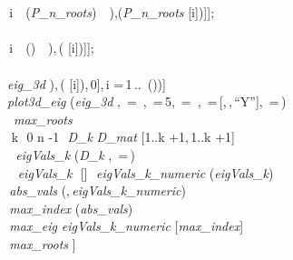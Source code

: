 \documentclass{article}
\begin{document}
{  \coloneqq []\colon 
\\
  \coloneqq []\colon 
\\
 \,i \,\, (\textit{P\_n\_roots})\, \, \coloneqq [\mathit{op} (\mathit{points}),\,[\Re (\textit{P\_n\_roots} [i]),\Im (\textit{P\_n\_roots} [i])]];
\\
 \,\colon 
\\
 \,i \,\, ()\, \, \coloneqq [\mathit{op} (\mathit{eig}),\,[\Re (\mathit{eigVals} [i]),\,\Im ( [i])]];
\\
 \,\colon 
\\
   \textit{eig\_3d} \coloneqq [\mathit{seq} ([\Re (\mathit{eigVals} [i]),\,\Im ( [i]),\,0],\,i =\,1\,..\, ())]\colon 
\\
 \textit{plot3d\_eig} \coloneqq {} (\textit{eig\_3d} ,\, =\, ,\, =\,5,\, =\, ,\, =\,[,\,,\,``Y''],\, =\,)\colon 
\\
 \, \textit{max\_roots} \coloneqq []\colon 
\\
 \,\,k \,\,0\,\,n -1\, \,\textit{D\_k} \coloneqq \textit{D\_mat} [1..k +1,\,1..k +1]\colon 
\\
 \, \,\textit{eigVals\_k} \coloneqq {} (\textit{D\_k} ,\, =\,)\colon 
\\
 \, \,\,\textit{eigVals\_k} \,\neq \,[]\, \,\textit{eigVals\_k\_numeric} \coloneqq {} (\textit{eigVals\_k})\colon 
\\
 \,\textit{abs\_vals} \coloneqq {} (,\,\textit{eigVals\_k\_numeric})\colon 
\\
 \,\textit{max\_index} \coloneqq {}(\textit{abs\_vals})\colon 
\\
 \,\textit{max\_eig} \coloneqq \textit{eigVals\_k\_numeric} [\textit{max\_index}]\colon 
\\
 \,\textit{max\_roots} \coloneqq [\mathit{op} (\textit{max\_roots}),\,[\Re (\textit{max\_eig}),\,\Im (\textit{max\_eig})]]\colon 
\\
 \,\,\colon 
\\
}
\end{document}
